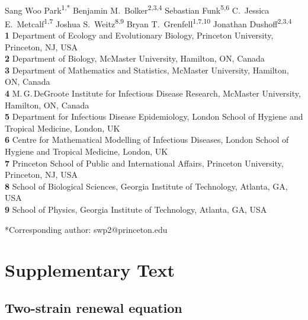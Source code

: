 \documentclass[12pt]{article}
\date{\today}
\begin{document}
\begin{flushleft}{
	\Large
	\textbf{}
}
\newline
\\
Sang Woo Park\textsuperscript{1,*}
Benjamin M.\ Bolker\textsuperscript{2,3,4}
Sebastian Funk\textsuperscript{5,6}
C.\ Jessica E.\ Metcalf\textsuperscript{1,7}
Joshua S.\ Weitz\textsuperscript{8,9}
Bryan T.\ Grenfell\textsuperscript{1,7,10}
Jonathan Dushoff\textsuperscript{2,3,4}
\\
\bigskip
\textbf{1} Department of Ecology and Evolutionary Biology, Princeton University, Princeton, NJ, USA
\\
\textbf{2} Department of Biology, McMaster University, Hamilton, ON, Canada
\\
\textbf{3} Department of Mathematics and Statistics, McMaster University, Hamilton, ON, Canada
\\
\textbf{4} M.\,G.\,DeGroote Institute for Infectious Disease Research, McMaster University, Hamilton, ON, Canada
\\
\textbf{5} Department for Infectious Disease Epidemiology, London School of Hygiene and Tropical Medicine, London, UK
\\
\textbf{6} Centre for Mathematical Modelling of Infectious Diseases, London School of Hygiene and Tropical Medicine, London, UK
\\
\textbf{7} Princeton School of Public and International Affairs, Princeton University, Princeton, NJ, USA
\\
\textbf{8} School of Biological Sciences, Georgia Institute of Technology, Atlanta, GA, USA
\\
\textbf{9} School of Physics, Georgia Institute of Technology, Atlanta, GA, USA
\\
\bigskip

*Corresponding author: swp2@princeton.edu
\bigskip

\end{flushleft}


\section{Supplementary Text}

\subsection{Two-strain renewal equation}
\end{document}
